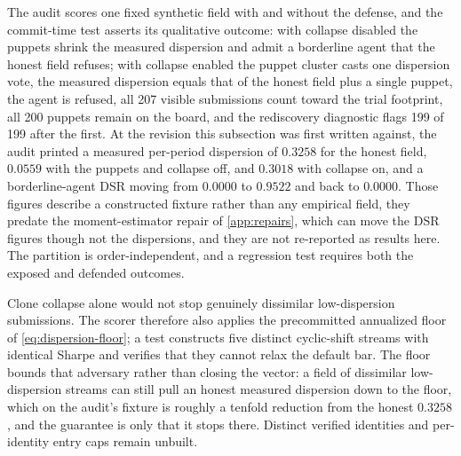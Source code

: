 The audit scores one fixed synthetic field with and without the defense, and the commit-time test asserts its qualitative outcome: with collapse disabled the puppets shrink the measured dispersion and admit a borderline agent that the honest field refuses; with collapse enabled the puppet cluster casts one dispersion vote, the measured dispersion equals that of the honest field plus a single puppet, the agent is refused, all 207 visible submissions count toward the trial footprint, all 200 puppets remain on the board, and the rediscovery diagnostic flags 199 of 199 after the first. At the revision this subsection was first written against, the audit printed a measured per-period dispersion of $0.3258$ for the honest field, $0.0559$ with the puppets and collapse off, and $0.3018$ with collapse on, and a borderline-agent DSR moving from $0.0000$ to $0.9522$ and back to $0.0000$. Those figures describe a constructed fixture rather than any empirical field, they predate the moment-estimator repair of \cref{app:repairs}, which can move the DSR figures though not the dispersions, and they are not re-reported as results here. The partition is order-independent, and a regression test requires both the exposed and defended outcomes.

Clone collapse alone would not stop genuinely dissimilar low-dispersion submissions. The scorer therefore also applies the precommitted annualized floor of \cref{eq:dispersion-floor}; a test constructs five distinct cyclic-shift streams with identical Sharpe and verifies that they cannot relax the default bar. The floor bounds that adversary rather than closing the vector: a field of dissimilar low-dispersion streams can still pull an honest measured dispersion down to the floor, which on the audit's fixture is roughly a tenfold reduction from the honest $0.3258$, and the guarantee is only that it stops there. Distinct verified identities and per-identity entry caps remain unbuilt.
